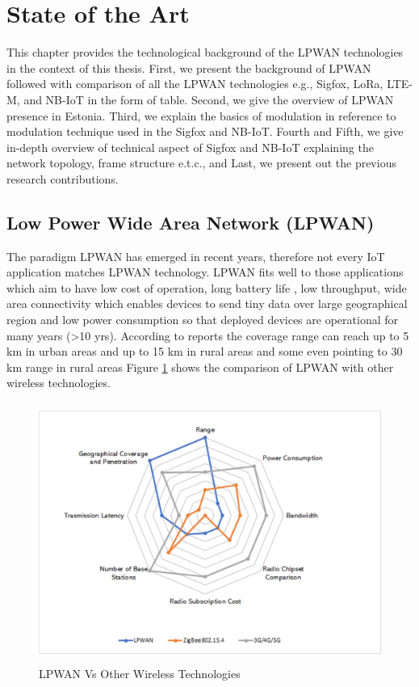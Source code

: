 \documentclass[12pt]{article}
\begin{document}
\newpage
\section{State of the Art}\label{State of the Art}
This chapter provides the technological background of the LPWAN technologies in the context of this thesis. First, we present the background of LPWAN followed with comparison of all the LPWAN technologies e.g., Sigfox, LoRa, LTE-M, and NB-IoT  in the form of table. Second, we give the overview of LPWAN presence in Estonia. Third, we explain the basics of modulation in reference to modulation technique used in the Sigfox and NB-IoT. Fourth and Fifth, we give in-depth overview of technical aspect of Sigfox and NB-IoT explaining the network topology, frame structure e.t.c., and Last, we present out the previous research contributions.

\subsection{Low Power Wide Area Network (LPWAN)}

The paradigm LPWAN has emerged in recent years, therefore not every IoT application matches LPWAN technology. LPWAN fits well to those applications which aim to have low cost of operation, long battery life , low throughput, wide area connectivity which enables devices to send tiny data over large geographical region and low power consumption so that deployed devices are operational for many years (>10 yrs). According to reports the coverage range can reach up to 5 km in urban areas and up to 15 km in rural areas \cite{centenaro2016long} and some even pointing to 30 km range in rural areas \cite{petajajarvi2016evaluation} Figure \ref{fig:LPWAN Vs Other Wireless Technologies} shows the comparison of LPWAN with other wireless technologies.


\begin{figure}[H]
  \includegraphics[trim={3cm 0 4cm 0},width=\columnwidth,height=8.5cm,keepaspectratio]{Images/lpwan_radar_3.pdf}
  \centering
  \caption{LPWAN Vs Other Wireless Technologies \cite{lpwanradar}}
  \label{fig:LPWAN Vs Other Wireless Technologies}
\end{figure}
\end{document}
